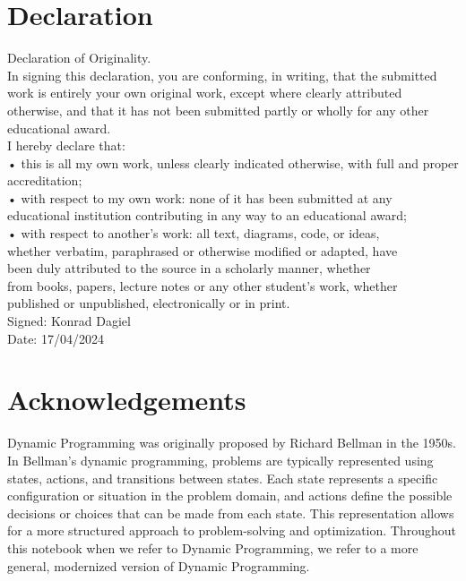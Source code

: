 \documentclass[12pt]{report}
\theoremstyle{definition}
\begin{document}
\chapter*{Declaration}
Declaration of Originality.\\
In signing this declaration, you are conforming, in writing, that the submitted work is entirely your own original work, except where clearly attributed otherwise, and that it has not been submitted partly or wholly for
any other educational award.\\
I hereby declare that:\\
• this is all my own work, unless clearly indicated otherwise, with full
and proper accreditation;\\
• with respect to my own work: none of it has been submitted at any educational institution contributing in any way to an educational award;\\
• with respect to another’s work: all text, diagrams, code, or ideas,\\
whether verbatim, paraphrased or otherwise modified or adapted, have\\
been duly attributed to the source in a scholarly manner, whether\\
from books, papers, lecture notes or any other student’s work, whether\\
published or unpublished, electronically or in print.\\
Signed: Konrad Dagiel\\
Date: 17/04/2024

\chapter*{Acknowledgements}
Dynamic Programming was originally proposed by Richard Bellman in the 1950s.
In Bellman's dynamic programming, problems are typically represented using states, actions, and transitions between states.
Each state represents a specific configuration or situation in the problem domain, and actions define the possible decisions or choices that can be made from each state.
This representation allows for a more structured approach to problem-solving and optimization.
Throughout this notebook when we refer to Dynamic Programming, we refer to a more general, modernized version of Dynamic Programming.

\tableofcontents






\end{document}
